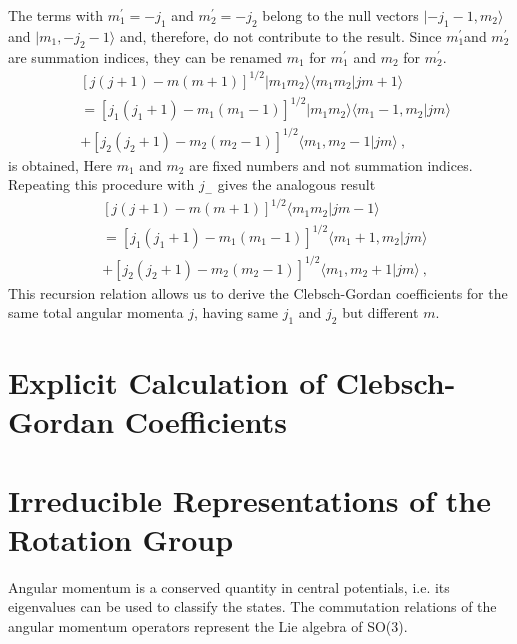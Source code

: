 \documentclass[12pt,a4paper]{article}
\begin{document}
The terms with $m^\prime_1 = - j_1$ and $m^\prime_2 = -j_2$ belong to the null vectors $|-j_1 -1, m_2 \rangle$ and $|m_1, -j_2 -1 \rangle$ and, therefore, do not contribute to the result. Since $m^\prime_1$and $m^\prime_2$ are summation indices, they can be renamed $m_1$ for $m^\prime_1$ and $m_2$ for $m^\prime_2$.
\begin{align*}
& [j(j + 1) - m(m + 1)]^{1/2} | m_1 m_2 \rangle \langle m_1 m_2| j m + 1 \rangle \\
&= [j_1 (j_1 + 1) - m_1(m_1 - 1)]^{1/2} |m_1 m_2\rangle \langle m_1 - 1, m_2 | jm\rangle \\
&+ [j_2 (j_2 + 1) - m_2(m_2 - 1)]^{1/2} \langle m_1, m_2 - 1| jm \rangle ~,
\end{align*}
is obtained, Here $m_1$ and $m_2$ are fixed numbers and not summation indices. Repeating this procedure with $j_-$ gives the analogous result
\begin{align*}
& [j(j + 1) - m(m + 1)]^{1/2} \langle m_1 m_2| j m - 1 \rangle \\
&= [j_1 (j_1 + 1) - m_1(m_1 - 1)]^{1/2} \langle m_1 + 1, m_2 | jm\rangle \\
&+ [j_2 (j_2 + 1) - m_2(m_2 - 1)]^{1/2} \langle m_1, m_2 + 1| jm \rangle ~,
\end{align*}
This recursion relation allows us to derive the Clebsch-Gordan coefficients for the same total angular momenta $j$, having same $j_1$ and $j_2$ but different $m$.











\section{Explicit Calculation of Clebsch-Gordan Coefficients}
\cite{greiner1994quantum} 





















\section{Irreducible Representations of the Rotation Group}
\cite{greiner1994quantum} Angular momentum is a conserved quantity in central potentials, i.e. its eigenvalues can be used to classify the states. The commutation relations of the angular momentum operators represent the Lie algebra of SO(3).
\end{document}
